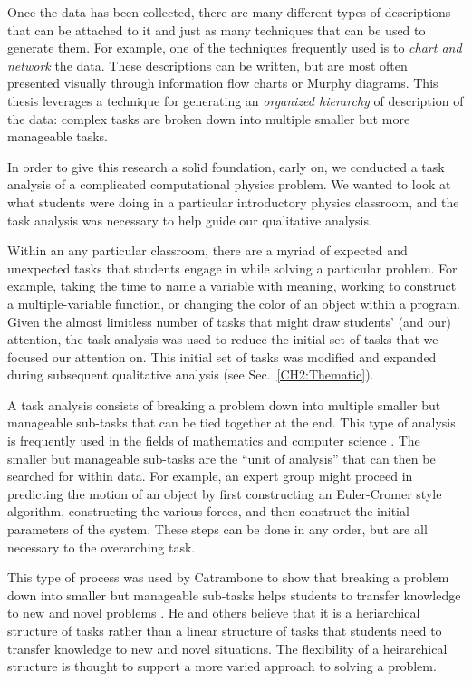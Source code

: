 \documentclass{msuphddissertation}
\begin{document}
\begin{doublespace}
Once the data has been collected, there are many different types of descriptions that can be attached to it and just as many techniques that can be used to generate them.  For example, one of the techniques frequently used is to \textit{chart and network} the data.  These descriptions can be written, but are most often presented visually through information flow charts or Murphy diagrams.  This thesis leverages a technique for generating an \textit{organized hierarchy} of description of the data: complex tasks are broken down into multiple smaller but more manageable tasks.

In order to give this research a solid foundation, early on, we conducted a task analysis of a complicated computational physics problem.  We wanted to look at what students were doing in a particular introductory physics classroom, and the task analysis was necessary to help guide our qualitative analysis.

Within an any particular classroom, there are a myriad of expected and unexpected tasks that students engage in while solving a particular problem.  For example, taking the time to name a variable with meaning, working to construct a multiple-variable function, or changing the color of an object within a program.  Given the almost limitless number of tasks that might draw students' (and our) attention, the task analysis was used to reduce the initial set of tasks that we focused our attention on.  This initial set of tasks was modified and expanded during subsequent qualitative analysis (see Sec.~\ref{CH2:Thematic}).

A task analysis consists of breaking a problem down into multiple smaller but manageable sub-tasks that can be tied together at the end.  This type of analysis is frequently used in the fields of mathematics and computer science \cite{Catrambone1998,Chandra1990,Fitzgerald2008,Ahmadzedah2005}.  The smaller but manageable sub-tasks are the ``unit of analysis'' that can then be searched for within data.  For example, an expert group might proceed in predicting the motion of an object by first constructing an Euler-Cromer style algorithm, constructing the various forces, and then construct the initial parameters of the system.  These steps can be done in any order, but are all necessary to the overarching task.

This type of process was used by Catrambone to show that breaking a problem down into smaller but manageable sub-tasks helps students to transfer knowledge to new and novel problems \cite{Catrambone1998}.  He and others believe that it is a heriarchical structure of tasks rather than a linear structure of tasks that students need to transfer knowledge to new and novel situations.  The flexibility of a heirarchical structure is thought to support a more varied approach to solving a problem.


\end{doublespace}
\end{document}
